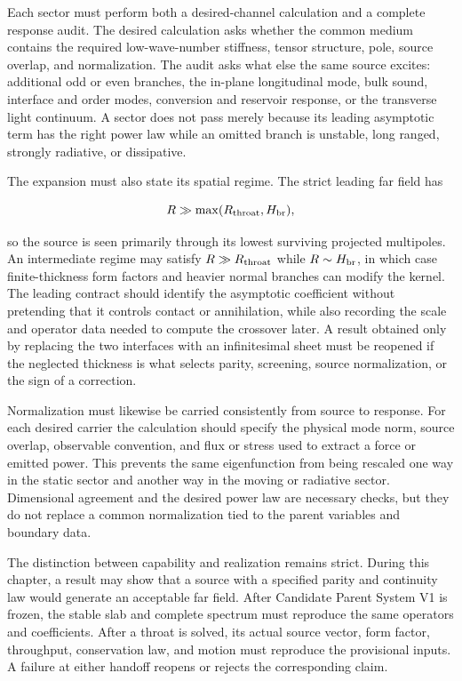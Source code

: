Each sector must perform both a desired-channel calculation and a complete
response audit. The desired calculation asks whether the common medium contains
the required low-wave-number stiffness, tensor structure, pole, source overlap,
and normalization. The audit asks what else the same source excites: additional
odd or even branches, the in-plane longitudinal mode, bulk sound, interface and
order modes, conversion and reservoir response, or the transverse light
continuum. A sector does not pass merely because its leading asymptotic term has
the right power law while an omitted branch is unstable, long ranged, strongly
radiative, or dissipative.

The expansion must also state its spatial regime. The strict leading far field
has

\[
R\gg \max(R_{\rm throat},H_{\rm br}),
\]

so the source is seen primarily through its lowest surviving projected
multipoles. An intermediate regime may satisfy \(R\gg R_{\rm throat}\) while
\(R\sim H_{\rm br}\), in which case finite-thickness form factors and heavier
normal branches can modify the kernel. The leading contract should identify the
asymptotic coefficient without pretending that it controls contact or
annihilation, while also recording the scale and operator data needed to compute
the crossover later. A result obtained only by replacing the two interfaces
with an infinitesimal sheet must be reopened if the neglected thickness is what
selects parity, screening, source normalization, or the sign of a correction.

Normalization must likewise be carried consistently from source to response.
For each desired carrier the calculation should specify the physical mode norm,
source overlap, observable convention, and flux or stress used to extract a
force or emitted power. This prevents the same eigenfunction from being
rescaled one way in the static sector and another way in the moving or
radiative sector. Dimensional agreement and the desired power law are necessary
checks, but they do not replace a common normalization tied to the parent
variables and boundary data.

The distinction between capability and realization remains strict. During this
chapter, a result may show that a source with a specified parity and continuity
law would generate an acceptable far field. After Candidate Parent System V1 is
frozen, the stable slab and complete spectrum must reproduce the same operators
and coefficients. After a throat is solved, its actual source vector, form
factor, throughput, conservation law, and motion must reproduce the provisional
inputs. A failure at either handoff reopens or rejects the corresponding claim.

